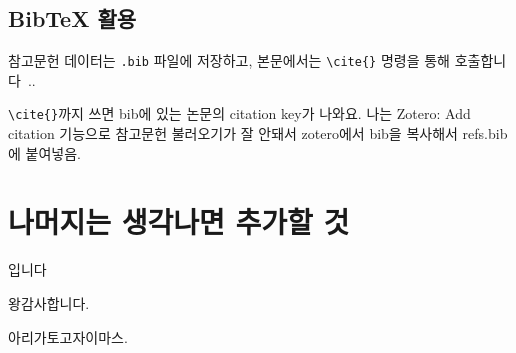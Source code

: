 \documentclass[doctor, korean]{pnuthesis_me}
\begin{document}
\section{BibTeX 활용}
참고문헌 데이터는 \texttt{.bib} 파일에 저장하고, 본문에서는 \verb|\cite{}| 명령을 통해 호출합니다~\cite{childsFiniteLengthSolutionsRotordynamic1983}..

\verb|\cite{}|까지 쓰면 bib에 있는 논문의 citation key가 나와요.
나는 Zotero: Add citation 기능으로 참고문헌 불러오기가 잘 안돼서 zotero에서 bib을 복사해서 refs.bib에 붙여넣음.



%
%
 


\appendix
\chapter{나머지는 생각나면 추가할 것}
입니다

\pagebreak


\acknowledgement 

왕감사합니다.

아리가토고자이마스.
\end{document}
